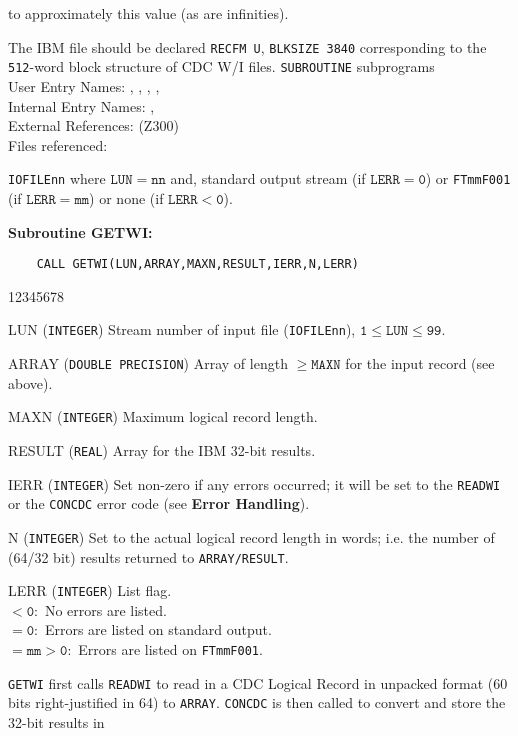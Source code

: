 to approximately this value (as are infinities).
\par
The IBM file should be declared {\tt RECFM U}, {\tt BLKSIZE 3840}
corresponding to the {\tt 512}-word block structure of CDC W/I files.
\Structure
{\tt SUBROUTINE} subprograms \\
User Entry Names: , , ,
,  \\
Internal Entry Names: ,  \\
External References:  (Z300) \\
Files referenced:
\parbox[t]{135mm}
{{\tt IOFILEnn} where $\mathtt{LUN=nn}$ and, standard output stream
(if $\mathtt{LERR=0}$) or {\tt FTmmF001} (if $\mathtt{LERR=mm}$) or none
(if $\mathtt{ LERR < 0}$).}
\newpage
\Usage
{\bf Subroutine GETWI:}
\begin{verbatim}
    CALL GETWI(LUN,ARRAY,MAXN,RESULT,IERR,N,LERR)
\end{verbatim}
\begin{DLtt}{12345678}
\item[LUN] ({\tt INTEGER}) Stream number of input file ({\tt IOFILEnn}),
$\mathtt{1 \leq LUN \leq 99}$.
\item[ARRAY] ({\tt DOUBLE PRECISION}) Array of length $\mathtt{\geq MAXN}$
for the input record (see above).
\item[MAXN] ({\tt INTEGER}) Maximum logical record length.
\item[RESULT] ({\tt REAL}) Array for the IBM 32-bit results.
\item[IERR] ({\tt INTEGER}) Set non-zero if any errors occurred;
it will be set to the {\tt READWI} or the {\tt CONCDC} error code
(see {\bf Error Handling}).
\item[N] ({\tt INTEGER}) Set to the actual logical record length in
words; i.e. the number of (64/32 bit) results returned to
{\tt ARRAY/RESULT}.
\item[LERR] ({\tt INTEGER}) List flag.  \\
$\mathtt{< 0:}$ No errors are listed. \\
$\mathtt{= 0:}$ Errors are listed on standard output. \\
$\mathtt{= mm > 0:}$ Errors are listed on {\tt FTmmF001}.
\end{DLtt}
\Method
{\tt GETWI} first calls {\tt READWI} to read in a CDC Logical Record in
unpacked format (60 bits right-justified in 64) to {\tt ARRAY}.
{\tt CONCDC} is then called to convert and store the 32-bit results in
